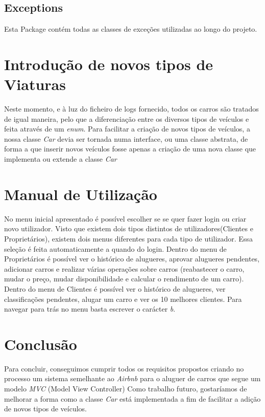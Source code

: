 \documentclass[a4paper]{report}
\begin{document}
\section{Exceptions}

Esta Package contém todas as classes de exceções utilizadas ao longo do projeto.

\chapter{Introdução de novos tipos de Viaturas}

Neste momento, e à luz do ficheiro de logs fornecido, todos os carros são tratados de igual maneira,
pelo que a diferenciação entre os diversos tipos de veículos e feita através de um \textit{enum}.
Para facilitar a criação de novos tipos de veículos, a nossa classe \textit{Car} 
devia ser tornada numa interface, ou uma classe abstrata, de forma a que inserir novos veículos fosse
apenas a criação de uma nova classe que implementa ou extende a classe \textit{Car}

\chapter{Manual de Utilização}

No menu inicial apresentado é possível escolher se se quer fazer login ou criar novo utilizador.
Visto que existem dois tipos distintos de utilizadores(Clientes e Proprietários), existem dois menus
diferentes para cada tipo de utilizador. Essa seleção é feita automaticamente a quando do login.
Dentro do menu de Proprietários é possível ver o histórico de alugueres, aprovar alugueres pendentes,
 adicionar carros e realizar várias operações sobre carros (reabastecer o carro, mudar o preço, mudar disponibilidade
 e calcular o rendimento de um carro).
Dentro do menu de Clientes é possível ver o histórico de alugueres, ver classificações pendentes, alugar um carro e
ver os 10 melhores clientes.
Para navegar para trás no menu basta escrever o carácter \textit{b}.

\chapter{Conclusão}

Para concluir, conseguimos cumprir todos os requisitos propostos criando no processo um
sistema semelhante ao \textit{Airbnb} para o aluguer de carros que segue um modelo \textit{MVC} (Model View Controller)
Como trabalho futuro, gostaríamos de melhorar a forma como a classe \textit{Car} está implementada a fim
de facilitar a adição de novos tipos de veículos. 
\end{document}

